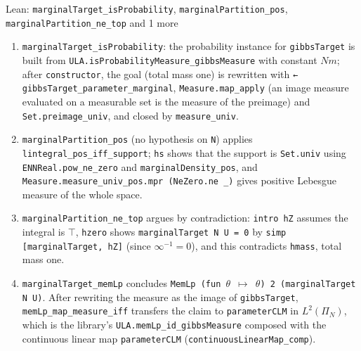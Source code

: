 \documentclass[11pt,a4paper]{report}
\begin{document}
\begin{leanbox}{Lean: \texttt{marginalTarget\_\allowbreak{}isProbability}, \texttt{marginalPartition\_\allowbreak{}pos}, \texttt{marginalPartition\_\allowbreak{}ne\_\allowbreak{}top} and 1 more}
\begin{enumerate}
\item \texttt{marginal\allowbreak{}Target\_\allowbreak{}is\allowbreak{}Probability}: the probability instance for \texttt{gibbs\allowbreak{}Target} is built from \texttt{ULA.\allowbreak{}is\allowbreak{}Probability\allowbreak{}Measure\_\allowbreak{}gibbs\allowbreak{}Measure} with constant \(Nm\); after \texttt{constructor}, the goal (total mass one) is rewritten with \texttt{← gibbs\allowbreak{}Target\_\allowbreak{}parameter\_\allowbreak{}marginal}, \texttt{Measure.\allowbreak{}map\_\allowbreak{}apply} (an image measure evaluated on a measurable set is the measure of the preimage) and \texttt{Set.\allowbreak{}preimage\_\allowbreak{}univ}, and closed by \texttt{measure\_\allowbreak{}univ}.

\item \texttt{marginal\allowbreak{}Partition\_\allowbreak{}pos} (no hypothesis on \texttt{N}) applies \texttt{lintegral\_\allowbreak{}pos\_\allowbreak{}iff\_\allowbreak{}support}; \texttt{hs} shows that the support is \texttt{Set.\allowbreak{}univ} using \texttt{ENNReal.\allowbreak{}pow\_\allowbreak{}ne\_\allowbreak{}zero} and \texttt{marginal\allowbreak{}Density\_\allowbreak{}pos}, and \texttt{Measure.\allowbreak{}measure\_\allowbreak{}univ\_\allowbreak{}pos.\allowbreak{}mpr (Ne\allowbreak{}Zero.\allowbreak{}ne \_\allowbreak{})} gives positive Lebesgue measure of the whole space.

\item \texttt{marginal\allowbreak{}Partition\_\allowbreak{}ne\_\allowbreak{}top} argues by contradiction: \texttt{intro h\allowbreak{}Z} assumes the integral is \texttt{\ensuremath{\top}}, \texttt{hzero} shows \texttt{marginal\allowbreak{}Target N U = 0} by \texttt{simp [marginal\allowbreak{}Target, h\allowbreak{}Z]} (since \(\infty^{-1}=0\)), and this contradicts \texttt{hmass}, total mass one.

\item \texttt{marginal\allowbreak{}Target\_\allowbreak{}mem\allowbreak{}Lp} concludes \texttt{Mem\allowbreak{}Lp (fun \ensuremath{\theta} \ensuremath{\mapsto} \ensuremath{\theta}) 2 (marginal\allowbreak{}Target N U)}. After rewriting the measure as the image of \texttt{gibbs\allowbreak{}Target}, \texttt{mem\allowbreak{}Lp\_\allowbreak{}map\_\allowbreak{}measure\_\allowbreak{}iff} transfers the claim to \texttt{parameter\allowbreak{}CLM} in \(L^2(\Pi_N)\), which is the library's \texttt{ULA.\allowbreak{}mem\allowbreak{}Lp\_\allowbreak{}id\_\allowbreak{}gibbs\allowbreak{}Measure} composed with the continuous linear map \texttt{parameter\allowbreak{}CLM} (\texttt{continuous\allowbreak{}Linear\allowbreak{}Map\_\allowbreak{}comp}).

\end{enumerate}
\end{leanbox}
\end{document}
